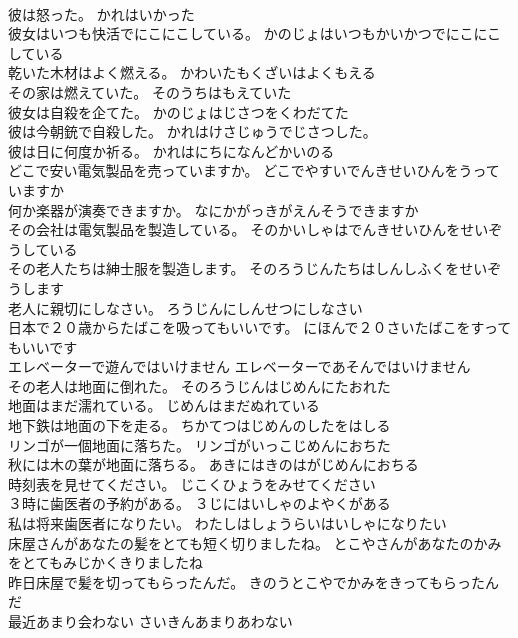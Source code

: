 \documentclass[8pt]{extreport}
\begin{document}
\begin{CJK}{UTF8}{min}
\\	彼は怒った。	かれはいかった 
\\	彼女はいつも快活でにこにこしている。	かのじょはいつもかいかつでにこにこしている 
\\	乾いた木材はよく燃える。	かわいたもくざいはよくもえる 
\\	その家は燃えていた。	そのうちはもえていた 
\\	彼女は自殺を企てた。	かのじょはじさつをくわだてた 
\\	彼は今朝銃で自殺した。	かれはけさじゅうでじさつした。 
\\	彼は日に何度か祈る。	かれはにちになんどかいのる 
\\	どこで安い電気製品を売っていますか。	どこでやすいでんきせいひんをうっていますか 
\\	何か楽器が演奏できますか。	なにかがっきがえんそうできますか 
\\	その会社は電気製品を製造している。	そのかいしゃはでんきせいひんをせいぞうしている 
\\	その老人たちは紳士服を製造します。	そのろうじんたちはしんしふくをせいぞうします 
\\	老人に親切にしなさい。	ろうじんにしんせつにしなさい 
\\	日本で２０歳からたばこを吸ってもいいです。	にほんで２０さいたばこをすってもいいです 
\\	エレベーターで遊んではいけません	エレベーターであそんではいけません 
\\	その老人は地面に倒れた。	そのろうじんはじめんにたおれた 
\\	地面はまだ濡れている。	じめんはまだぬれている 
\\	地下鉄は地面の下を走る。	ちかてつはじめんのしたをはしる 
\\	リンゴが一個地面に落ちた。	リンゴがいっこじめんにおちた 
\\	秋には木の葉が地面に落ちる。	あきにはきのはがじめんにおちる 
\\	時刻表を見せてください。	じこくひょうをみせてください 
\\	３時に歯医者の予約がある。	３じにはいしゃのよやくがある 
\\	私は将来歯医者になりたい。	わたしはしょうらいはいしゃになりたい 
\\	床屋さんがあなたの髪をとても短く切りましたね。	とこやさんがあなたのかみをとてもみじかくきりましたね 
\\	昨日床屋で髪を切ってもらったんだ。	きのうとこやでかみをきってもらったんだ 
\\	最近あまり会わない	さいきんあまりあわない 

\end{CJK}
\end{document}
